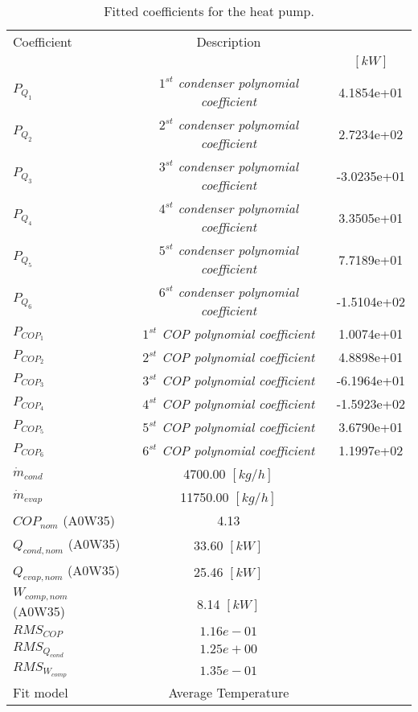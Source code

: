 \documentclass[english]{SPFShortReport}
\author{Dani Carbonell}
\begin{document}
\begin{table}[!ht]
\begin{small}
\caption{Fitted coefficients for the heat pump.}
\begin{center}
\resizebox{12cm}{!} 
{
\begin{tabular}{l | c c } 
\hline
\hline
Coefficient &Description & \\ 
 & &$[kW]$\\ 
\hline
$P_{Q_{1}}$ & \emph{$1^{st}$ condenser polynomial coefficient}  & 4.1854e+01    \\ 
$P_{Q_{2}}$ & \emph{$2^{st}$ condenser polynomial coefficient}  & 2.7234e+02    \\ 
$P_{Q_{3}}$ & \emph{$3^{st}$ condenser polynomial coefficient}  & -3.0235e+01    \\ 
$P_{Q_{4}}$ & \emph{$4^{st}$ condenser polynomial coefficient}  & 3.3505e+01    \\ 
$P_{Q_{5}}$ & \emph{$5^{st}$ condenser polynomial coefficient}  & 7.7189e+01    \\ 
$P_{Q_{6}}$ & \emph{$6^{st}$ condenser polynomial coefficient}  & -1.5104e+02    \\ 
\hline
$P_{COP_{1}}$ & \emph{$1^{st}$ COP polynomial coefficient}  & 1.0074e+01    \\ 
$P_{COP_{2}}$ & \emph{$2^{st}$ COP polynomial coefficient}  & 4.8898e+01    \\ 
$P_{COP_{3}}$ & \emph{$3^{st}$ COP polynomial coefficient}  & -6.1964e+01    \\ 
$P_{COP_{4}}$ & \emph{$4^{st}$ COP polynomial coefficient}  & -1.5923e+02    \\ 
$P_{COP_{5}}$ & \emph{$5^{st}$ COP polynomial coefficient}  & 3.6790e+01    \\ 
$P_{COP_{6}}$ & \emph{$6^{st}$ COP polynomial coefficient}  & 1.1997e+02    \\ 
\hline
$\dot m_{cond}$ & 4700.00 $[kg/h]$ \\ 
$\dot m_{evap}$ & 11750.00 $[kg/h]$ \\ 
\hline
$COP_{nom}$ (A0W35)& 4.13 \\ 
$Q_{cond,nom}$ (A0W35)& 33.60 $[kW]$\\ 
$Q_{evap,nom}$ (A0W35)& 25.46 $[kW]$\\ 
$W_{comp,nom}$ (A0W35)& 8.14 $[kW]$\\ 
\hline
 $RMS_{COP}$ & $1.16e-01$ \\ 
 $RMS_{Q_{cond}}$ & $1.25e+00$ \\ 
 $RMS_{W_{comp}}$ & $1.35e-01$ \\ 
\hline
Fit model & Average Temperature\\ 
\hline
\hline
\end{tabular}
}
\label{CoefTable}
\end{center}
\end{small}
\end{table}
\end{document}
